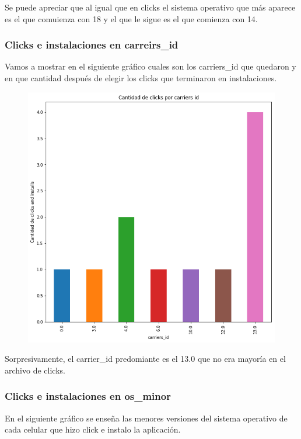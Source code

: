 \documentclass[a4paper, 12pt]{article}
\begin{document}
{{	Se puede apreciar que al igual que en clicks el sistema operativo que más aparece es el que comuienza con 18 y el que le sigue es el que comienza con 14.
	
	\subsubsection{Clicks e instalaciones en carreirs\_id}
	Vamos a mostrar en el siguiente gráfico cuales son los carriers\_id que quedaron y en que cantidad después de elegir los clicks que terminaron en instalaciones.
	
	
		\begin{figure}[H]
			\centering
			\includegraphics[scale = 0.4]{images/clicks-installs/carrier_id.png}
			\caption{}
		\end{figure}
	

	Sorpresivamente, el carrier\_id predomiante es el 13.0 que no era mayoría en el archivo de clicks.
	
	\subsubsection{Clicks e instalaciones en os\_minor}
	En el siguiente gráfico se enseña las menores versiones del sistema operativo de cada celular que hizo click e instalo la aplicación.
	
}}
\end{document}

